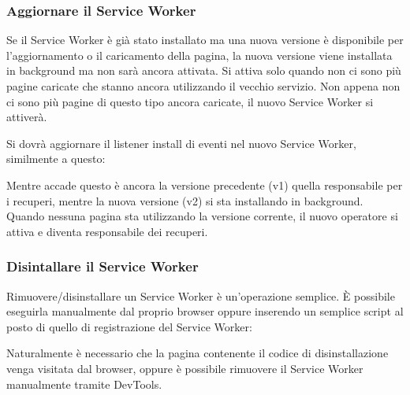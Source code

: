\documentclass[11pt ,a4paper , twoside , openright ]{article}
\begin{document}
\subsubsection{Aggiornare il Service Worker}
Se il Service Worker è già stato installato ma una nuova versione è disponibile per l'aggiornamento o il caricamento della pagina, la nuova versione viene installata in background ma non sarà ancora attivata. Si attiva solo quando non ci sono più pagine caricate che stanno ancora utilizzando il vecchio servizio. Non appena non ci sono più pagine di questo tipo ancora caricate, il nuovo Service Worker si attiverà.

Si dovrà aggiornare il listener install di eventi nel nuovo Service Worker, similmente a questo:

Mentre accade questo è ancora la versione precedente (v1) quella responsabile per i recuperi, mentre la nuova versione (v2) si sta installando in background.
Quando nessuna pagina sta utilizzando la versione corrente, il nuovo operatore si attiva e diventa responsabile dei recuperi.

\subsubsection{Disintallare il Service Worker}

Rimuovere/disinstallare un Service Worker è un’operazione semplice. È possibile eseguirla manualmente dal proprio browser oppure inserendo un semplice script al posto di quello di registrazione del Service Worker:

Naturalmente è necessario che la pagina contenente il codice di disinstallazione venga visitata dal browser, oppure è possibile rimuovere il Service Worker manualmente tramite DevTools.
\newpage
\end{document}
